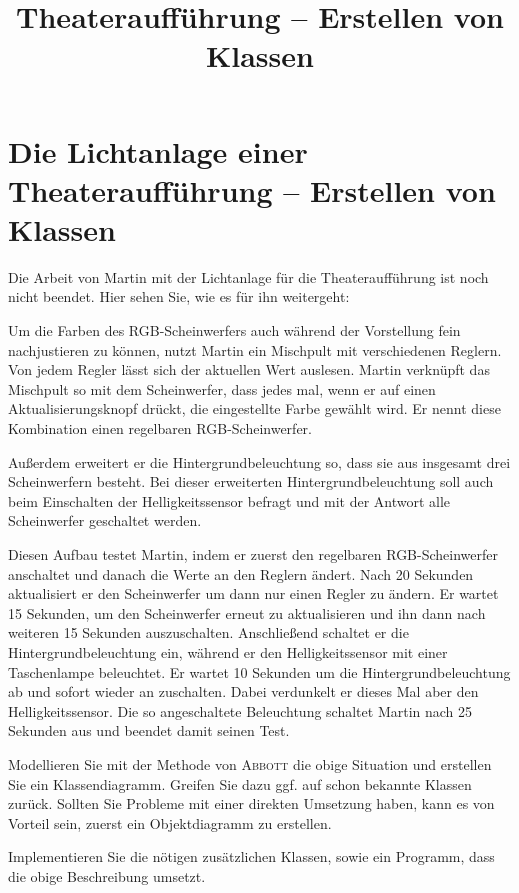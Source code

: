 \documentclass[11pt,a4paper,parskip=half]{scrartcl}
\title{Theateraufführung -- Erstellen von Klassen}
\begin{document}
\section*{Die Lichtanlage einer Theateraufführung -- Erstellen von Klassen}

Die Arbeit von Martin mit der Lichtanlage für die Theateraufführung ist noch nicht beendet. Hier sehen Sie, wie es für ihn weitergeht:

\begin{mdframed}
Um die Farben des RGB-Scheinwerfers auch während der Vorstellung fein nachjustieren zu können, nutzt Martin ein Mischpult mit verschiedenen Reglern. Von jedem Regler lässt sich der aktuellen Wert auslesen. Martin verknüpft das Mischpult so mit dem Scheinwerfer, dass jedes mal, wenn er auf einen Aktualisierungsknopf drückt, die eingestellte Farbe gewählt wird. Er nennt diese Kombination einen regelbaren RGB-Scheinwerfer.

Außerdem erweitert er die Hintergrundbeleuchtung so, dass sie aus insgesamt drei Scheinwerfern besteht. Bei dieser erweiterten Hintergrundbeleuchtung soll auch beim Einschalten der Helligkeitssensor befragt und mit der Antwort alle Scheinwerfer geschaltet werden.

Diesen Aufbau testet Martin, indem er zuerst den regelbaren RGB-Scheinwerfer anschaltet und danach die Werte an den Reglern ändert. Nach 20 Sekunden aktualisiert er den Scheinwerfer um dann nur einen Regler zu ändern. Er wartet 15 Sekunden, um den Scheinwerfer erneut zu aktualisieren und ihn dann nach weiteren 15 Sekunden auszuschalten. Anschließend schaltet er die Hintergrundbeleuchtung ein, während er den Helligkeitssensor mit einer Taschenlampe beleuchtet. Er wartet 10 Sekunden um die Hintergrundbeleuchtung ab und sofort wieder an zuschalten. Dabei verdunkelt er dieses Mal aber den Helligkeitssensor. Die so angeschaltete Beleuchtung schaltet Martin nach 25 Sekunden aus und beendet damit seinen Test.
\end{mdframed}

\begin{aufgabe}
	Modellieren Sie mit der Methode von \textsc{Abbott} die obige Situation und erstellen Sie ein Klassendiagramm. Greifen Sie dazu ggf. auf schon bekannte Klassen zurück. Sollten Sie Probleme mit einer direkten Umsetzung haben, kann es von Vorteil sein, zuerst ein Objektdiagramm zu erstellen.
\end{aufgabe}
\begin{aufgabe}
	Implementieren Sie die nötigen zusätzlichen Klassen, sowie ein Programm, dass die obige Beschreibung umsetzt.
\end{aufgabe}
\end{document}
